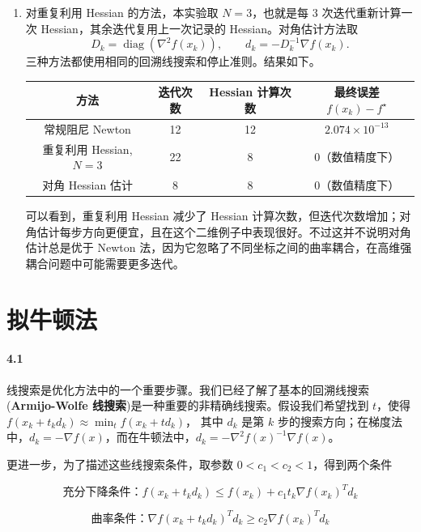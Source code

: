 \documentclass[12pt,a4paper]{article}
\begin{document}
\begin{enumerate}
  \item[(c)]
  对重复利用 Hessian 的方法，本实验取 $N=3$，也就是每 $3$ 次迭代重新计算一次 Hessian，其余迭代复用上一次记录的 Hessian。对角估计方法取
  \[
    D_k=\operatorname{diag}(\nabla^2 f(x_k)),
    \qquad
    d_k=-D_k^{-1}\nabla f(x_k).
  \]
  三种方法都使用相同的回溯线搜索和停止准则。结果如下。

  \begin{center}
  \renewcommand{\arraystretch}{1.25}
  \begin{tabular}{|c|c|c|c|}
  \hline
  方法 & 迭代次数 & Hessian 计算次数 & 最终误差 $f(x_k)-f^\star$\\
  \hline
  常规阻尼 Newton & 12 & 12 & $2.074\times10^{-13}$\\
  \hline
  重复利用 Hessian, $N=3$ & 22 & 8 & $0$（数值精度下）\\
  \hline
  对角 Hessian 估计 & 8 & 8 & $0$（数值精度下）\\
  \hline
  \end{tabular}
  \end{center}

  可以看到，重复利用 Hessian 减少了 Hessian 计算次数，但迭代次数增加；对角估计每步方向更便宜，且在这个二维例子中表现很好。不过这并不说明对角估计总是优于 Newton 法，因为它忽略了不同坐标之间的曲率耦合，在高维强耦合问题中可能需要更多迭代。
\end{enumerate}




\section{拟牛顿法}

\paragraph{4.1}
线搜索是优化方法中的一个重要步骤。我们已经了解了基本的回溯线搜索(\textbf{Armijo-Wolfe 线搜索})是一种重要的非精确线搜索。假设我们希望找到 $t$，使得
$f(x_k+t_kd_k) \approx \min_{t} f(x_k+td_k)$，
其中 $d_k$ 是第 $k$ 步的搜索方向；在梯度法中，$d_k=-\nabla f(x)$，而在牛顿法中，$d_k=-\nabla^2 f(x)^{-1} \nabla f(x)$。

更进一步，为了描述这些线搜索条件，取参数 $0<c_1<c_2<1$，得到两个条件


$$\textbf{充分下降条件：} f(x_k+t_k d_k) \leq f(x_k) +c_1t_k\nabla f(x_k)^T d_k$$

$$\textbf{曲率条件：} \nabla f(x_k+t_kd_k)^Td_k \geq c_2 \nabla f(x_k)^Td_k$$
\end{document}
